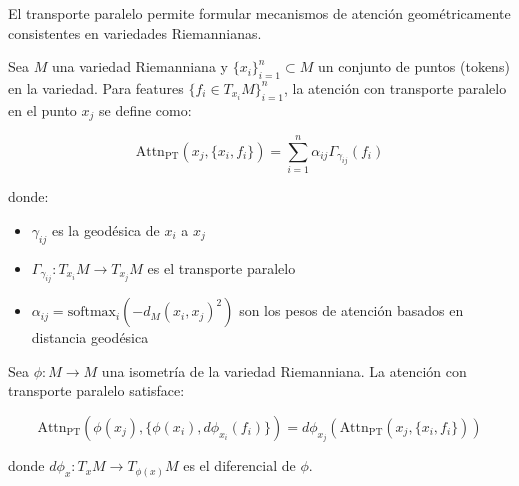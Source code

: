 El transporte paralelo permite formular mecanismos de atención geométricamente consistentes en variedades Riemannianas.

\begin{definition}\label{def:attention_parallel_transport}
Sea $M$ una variedad Riemanniana y $\{x_i\}_{i=1}^n \subset M$ un conjunto de puntos (tokens) en la variedad. Para features $\{f_i \in T_{x_i}M\}_{i=1}^n$, la atención con transporte paralelo en el punto $x_j$ se define como:

\begin{equation}
\text{Attn}_{\text{PT}}(x_j, \{x_i, f_i\}) = \sum_{i=1}^n \alpha_{ij} \Gamma_{\gamma_{ij}}(f_i)
\label{eq:attention_parallel_transport}
\end{equation}

donde:
\begin{itemize}
    \item $\gamma_{ij}$ es la geodésica de $x_i$ a $x_j$
    \item $\Gamma_{\gamma_{ij}}: T_{x_i}M \to T_{x_j}M$ es el transporte paralelo
    \item $\alpha_{ij} = \text{softmax}_i(-d_M(x_i, x_j)^2)$ son los pesos de atención basados en distancia geodésica
\end{itemize}
\end{definition}

\begin{theorem}\label{thm:attention_parallel_transport_equivariance}
Sea $\phi: M \to M$ una isometría de la variedad Riemanniana. La atención con transporte paralelo satisface:

\begin{equation}
\text{Attn}_{\text{PT}}(\phi(x_j), \{\phi(x_i), d\phi_{x_i}(f_i)\}) = d\phi_{x_j}(\text{Attn}_{\text{PT}}(x_j, \{x_i, f_i\}))
\end{equation}

donde $d\phi_x: T_x M \to T_{\phi(x)}M$ es el diferencial de $\phi$.
\end{theorem}


